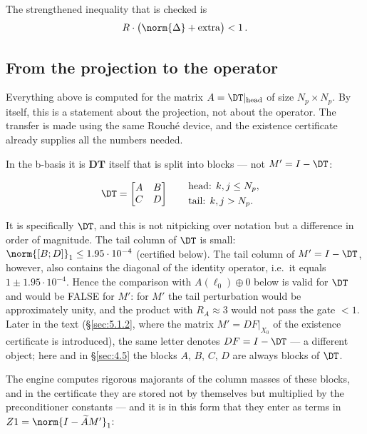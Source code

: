 The strengthened inequality that is checked is
\[
R \cdot \bigl( \norm{\Delta} + \mathrm{extra} \bigr) < 1\,.
\]



\subsection{From the projection to the operator}
\label{sec:4.6}

Everything above is computed for the matrix $A = \DT|_{\mathrm{head}}$ of
size $N_{p} \times N_{p}$. By itself, this is a statement about the
projection, not about the operator. The transfer is made using the same
Rouch\'e device, and the existence certificate already supplies all the
numbers needed.

In the b-basis it is $\mathbf{DT}$ itself that is split into blocks --- not
$M' = I - \DT$:

\begin{align*}
\DT &= \begin{bmatrix} A & B \\ C & D \end{bmatrix}
      \qquad
      \begin{aligned}
         &\text{head: } k, j \le N_{p} , \\
         &\text{tail: } k, j > N_{p} .
      \end{aligned}
\end{align*}

It is specifically $\DT$, and this is not nitpicking over notation but a
difference in order of magnitude. The tail column of $\DT$ is small:
$\norm{[B; D]}_{1} \le 1.95\cdot 10^{-4}$ (certified below). The tail
column of $M' = I - \DT$, however, also contains the diagonal of the
identity operator, i.e.\ it equals $1 \pm 1.95\cdot 10^{-4}$. Hence the
comparison with $A(\ell_{0}) \oplus 0$ below is valid for $\DT$ and would
be FALSE for $M'$: for $M'$ the tail perturbation would be approximately
unity, and the product with $R_{A} \approx 3$ would not pass the
gate $< 1$. Later in the text (\S\ref{sec:5.1.2}, where the matrix $M' = DF|_{X_{0}}$
of the existence certificate is introduced), the same letter denotes
$DF = I - \DT$ --- a different object; here and in \S\ref{sec:4.5} the blocks
$A$, $B$, $C$, $D$ are always blocks of $\DT$.

The engine computes rigorous majorants of the column masses of these
blocks, and in the certificate they are stored not by themselves but
multiplied by the preconditioner constants --- and it is in this form that
they enter as terms in $Z1 = \norm{I - \widetilde{A} M'}_{1}$:

